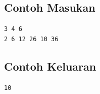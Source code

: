 \documentclass{article}
\begin{document}
\begin{multicols}{2}
\subsection*{Contoh Masukan}
\begin{lstlisting}
3 4 6
2 6 12 26 10 36
\end{lstlisting}
\columnbreak
\subsection*{Contoh Keluaran}
\begin{lstlisting}
10
\end{lstlisting}
\vfill
\null
\end{multicols}

\pagebreak
\end{document}

